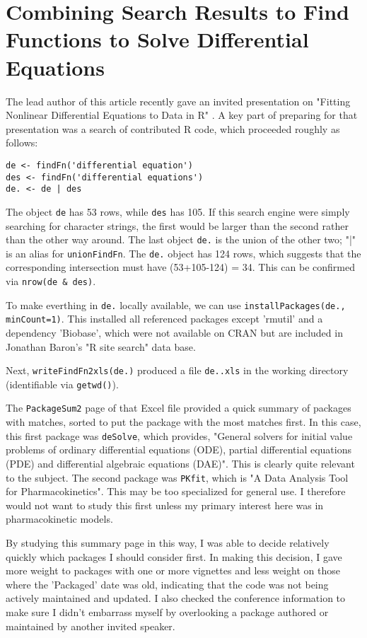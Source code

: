 \section*{Combining Search Results to Find Functions to Solve Differential Equations}

The lead author of this article recently gave an invited presentation
on "Fitting Nonlinear Differential Equations to Data in R" \citep{GHR09}.
A key part of preparing for that presentation was a search
of contributed R code, which proceeded roughly as follows:

\begin{verbatim}
de <- findFn('differential equation')
des <- findFn('differential equations')
de. <- de | des
\end{verbatim}

The object {\tt de} has 53 rows, while {\tt des} has 105.
If this search engine were simply searching for character
strings, the first would be larger than the second rather than
the other way around.  The last object {\tt de.} is the union
of the other two;  "|" is an alias for {\tt unionFindFn}.
The {\tt de.} object has 124 rows, which suggests that
the corresponding intersection must have (53+105-124) = 34.
This can be confirmed via {\tt nrow(de \& des)}.

To make everthing in {\tt de.} locally available, we can use
{\tt installPackages(de., minCount=1)}.  This installed all
referenced packages except 'rmutil' and a dependency 'Biobase',
which were not available on CRAN but are included in Jonathan
Baron's "R site search" data base.

Next, {\tt writeFindFn2xls(de.)} produced a file {\tt de..xls}
in the working directory (identifiable via {\tt getwd()}).

The {\tt PackageSum2} page of that Excel file provided a quick
summary of packages with matches, sorted to put the package
with the most matches first.  In this case, this first package
was {\tt deSolve}, which provides, "General solvers for initial
value problems of ordinary differential equations (ODE),
partial differential equations (PDE) and differential
algebraic equations (DAE)".  This is clearly quite relevant
to the subject.  The second package was {\tt PKfit}, which
is "A Data Analysis Tool for Pharmacokinetics".  This may
be too specialized for general use.  I therefore would not
want to study this first unless my primary interest here was in
pharmacokinetic models.

By studying this summary page in this way, I was able to decide
relatively quickly which packages I should consider first.  In
making this decision, I gave more weight to packages with
one or more vignettes and less weight on those where the
'Packaged' date was old, indicating that the code was not being
actively maintained and updated.  I also checked the conference
information to make sure I didn't embarrass myself by overlooking
a package authored or maintained by another invited speaker.

